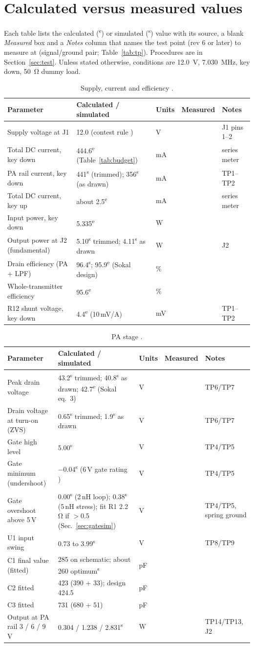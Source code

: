 \documentclass[11pt,letterpaper]{article}
\newcommand{\measured}{\fbox{\rule{0pt}{0.95em}\rule{2.0cm}{0pt}}}
\newcommand{\est}{\textsuperscript{e}}
\newcommand{\simv}{\textsuperscript{s}}
\begin{document}
\section{Calculated versus measured values}\label{sec:meas}

Each table lists the calculated (\est) or simulated (\simv) value with its source, a blank \emph{Measured} box and a \emph{Notes} column that names the test point (rev 6 or later) to measure at (signal/ground pair; Table~\ref{tab:tp}). Procedures are in Section~\ref{sec:test}. Unless stated otherwise, conditions are \SI{12.0}{\volt}, \SI{7.030}{\mega\hertz}, key down, \SI{50}{\ohm} dummy load.

\newcommand{\mrow}[4][]{#2 & #3 & #4 & \measured & #1\\[0.25em]}
\newenvironment{meastable}[2]{\begin{table}[H]\centering\small\caption{#1}\label{#2}\begin{tabular}{@{}L{4.3cm}L{4.2cm}L{1.1cm}L{2.3cm}L{2.6cm}@{}}\toprule Parameter & Calculated / simulated & Units & Measured & Notes \\ \midrule}{\bottomrule\end{tabular}\end{table}}

\begin{meastable}{Supply, current and efficiency \cite{projsim,projnotes}.}{tab:m-dc}
\mrow[J1 pins 1--2]{Supply voltage at J1}{12.0 (contest rule \cite{qrparci9611})}{V}
\mrow[series meter]{Total DC current, key down}{444.6\est{} (Table~\ref{tab:budget})}{mA}
\mrow[TP1--TP2]{PA rail current, key down}{441\simv{} (trimmed); 356\simv{} (as drawn)}{mA}
\mrow[series meter]{Total DC current, key up}{about 2.5\est}{mA}
\mrow{Input power, key down}{5.335\est}{W}
\mrow[J2]{Output power at J2 (fundamental)}{5.10\simv{} trimmed; 4.11\simv{} as drawn}{W}
\mrow{Drain efficiency (PA + LPF)}{96.4\simv; 95.9\est{} (Sokal design)}{\%}
\mrow{Whole-transmitter efficiency}{95.6\est}{\%}
\mrow[TP1--TP2]{R12 shunt voltage, key down}{4.4\est{} (10\,mV/A)}{mV}
\end{meastable}

\begin{meastable}{PA stage \cite{projsim,sokal2001}.}{tab:m-pa}
\mrow[TP6/TP7]{Peak drain voltage}{43.2\simv{} trimmed; 40.8\simv{} as drawn; 42.7\est{} (Sokal eq.~3)}{V}
\mrow[TP6/TP7]{Drain voltage at turn-on (ZVS)}{0.65\simv{} trimmed; 1.9\simv{} as drawn}{V}
\mrow[TP4/TP5]{Gate high level}{5.00\simv}{V}
\mrow[TP4/TP5]{Gate minimum (undershoot)}{$-0.04$\simv{} (6\,V gate rating \cite{epc2036ds})}{V}
\mrow[TP4/TP5, spring ground]{Gate overshoot above 5\,V}{0.00\simv{} (2\,nH loop); 0.38\simv{} (5\,nH stress); fit R1 2.2\,\si{\ohm} if $>$0.5 (Sec.~\ref{sec:gatesim})}{V}
\mrow[TP8/TP9]{U1 input swing}{0.73 to 3.99\simv}{V}
\mrow{C1 final value (fitted)}{285 on schematic; about 260 optimum\simv}{pF}
\mrow{C2 fitted}{423 (390 + 33); design 424.5}{pF}
\mrow{C3 fitted}{731 (680 + 51)}{pF}
\mrow[TP14/TP13, J2]{Output at PA rail 3 / 6 / 9 V}{0.304 / 1.238 / 2.831\simv}{W}
\end{meastable}
\end{document}
